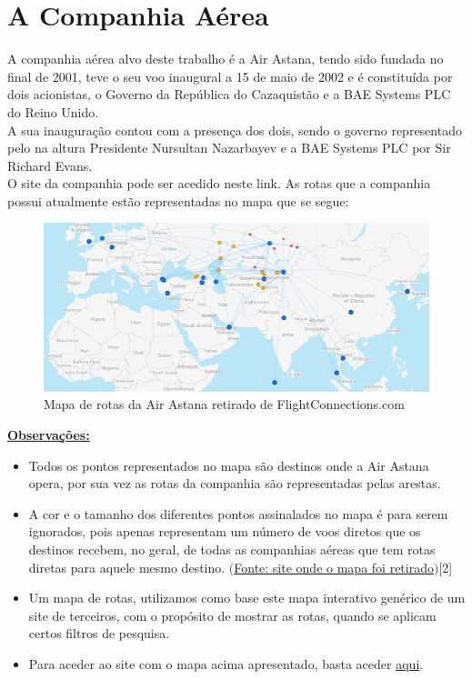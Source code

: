 \chapter{A Companhia Aérea}
\label{chapter:Companhia Aérea}
A companhia aérea alvo deste trabalho é a Air Astana, tendo sido fundada no final de 2001, teve o seu voo
inaugural a 15 de maio de 2002 e é constituída por dois acionistas, o Governo da República do Cazaquistão e a 
BAE Systems PLC do Reino Unido.\\
\indent A sua inauguração contou com a presença dos dois, sendo o governo
representado pelo na altura Presidente Nursultan Nazarbayev e a BAE Systems PLC por Sir Richard Evans.\\
\indent O site da companhia pode ser acedido neste link.
As rotas que a companhia possui atualmente estão representadas no mapa que se segue:

\begin{figure}[h]
        \centering
        \includegraphics[width=1\textwidth]{imgs/Figura1}
        \caption{Mapa de rotas da Air Astana retirado de FlightConnections.com\label{fig:imagem1}}
\end{figure}

\noindent\underline{\textbf{Observações:}}\\
\begin{itemize}
\item Todos os pontos representados no mapa são destinos onde a Air Astana opera, por sua vez as rotas da
companhia são representadas pelas arestas.
\item A cor e o tamanho dos diferentes pontos assinalados no mapa é para serem ignorados, pois apenas
representam um número de voos diretos que os destinos recebem, no geral, de todas as companhias aéreas 
que tem rotas diretas para aquele mesmo destino. \href{https://www.flightconnections.com}{$($Fonte: site onde o mapa foi retirado$)$}[2]

\item Um mapa de rotas, utilizamos como base este mapa interativo genérico de um site de terceiros, com o
propósito de mostrar as rotas, quando se aplicam certos filtros de pesquisa.
\item Para aceder ao site com o mapa acima apresentado, basta aceder \href{https://www.flightconnections.com/route-map-air-astana-kc}{aqui}.
\end{itemize}
\clearpage
